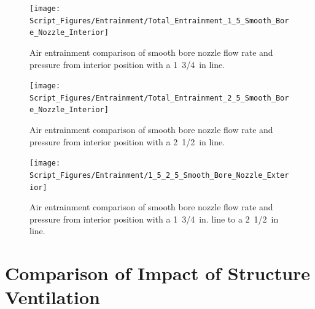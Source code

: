 \documentclass[12pt,oneside]{book}
\begin{document}
\begin{figure}[!ht]
\centering
\texttt{[image: Script\_Figures/Entrainment/Total\_Entrainment\_1\_5\_Smooth\_Bore\_Nozzle\_Interior]}
\caption[Air Entrainment Comparison of Exterior Smooth Bore Nozzle from 1~3/4~in. Line]{Air entrainment comparison of smooth bore nozzle flow rate and pressure from interior position with a 1~3/4~in line.}
\label{fig:SB_Flowrate}
\end{figure}

\begin{figure}[!ht]
\centering
\texttt{[image: Script\_Figures/Entrainment/Total\_Entrainment\_2\_5\_Smooth\_Bore\_Nozzle\_Interior]}
\caption[Air Entrainment Comparison of Exterior Smooth Bore Nozzle from 2~1/2~in. Line]{Air entrainment comparison of smooth bore nozzle flow rate and pressure from interior position with a 2~1/2~in line.}
\label{fig:SB_Flowrate}
\end{figure}


\begin{figure}[!ht]
\centering
\texttt{[image: Script\_Figures/Entrainment/1\_5\_2\_5\_Smooth\_Bore\_Nozzle\_Exterior]}
\caption[Air Entrainment Comparison of Exterior Smooth Bore Nozzle from 1~3/4~in LIne to 2~1/2~in. Line]{Air entrainment comparison of smooth bore nozzle flow rate and pressure from interior position with a 1~3/4~in. line to a 2~1/2~in line.}
\label{fig:SB_Flowrate}
\end{figure}


\clearpage


\section{Comparison of Impact of Structure Ventilation}



\end{document}
